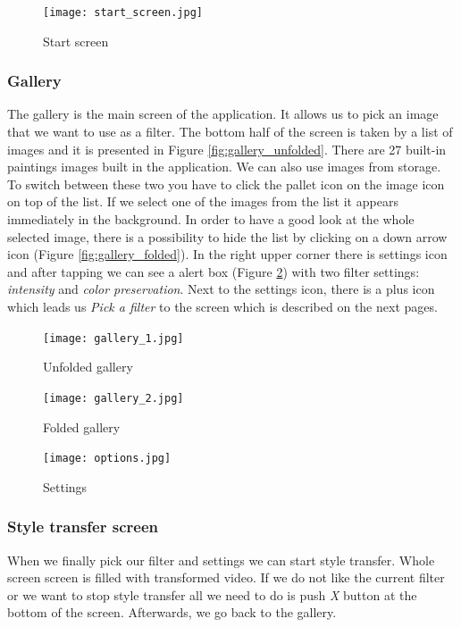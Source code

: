 \documentclass[../Main.tex]{subfiles}
\begin{document}
\begin{figure}[H]
    \centering
    \texttt{[image: start\_screen.jpg]}
    \caption{Start screen}
    \label{fig:start-screen}
\end{figure}


\subsubsection{Gallery}
The gallery is the main screen of the application. It allows us to pick an image 
that we want to use as a filter. The bottom half of the screen is taken by a list of images and it is presented in Figure \ref{fig:gallery_unfolded}.
There are 27 built-in paintings images built in the application. We can also use images from storage.
To switch between these two you have to click the pallet icon on the image icon on top of the list.
If we select one of the images from the list it appears immediately in the background.
In order to have a good look at the whole selected image, there is a possibility 
to hide the list by clicking on a down arrow icon (Figure \ref{fig:gallery_folded}).
In the right upper corner there is settings icon and after tapping we can see a 
alert box (Figure \ref{fig:gallery_options}) with two filter settings:
\textit{intensity} and \textit{color preservation}.
Next to the settings icon, there is a plus icon which leads us \textit{Pick a filter} 
to the screen which is described on the next pages.


\begin{figure}[H]
        \texttt{[image: gallery\_1.jpg]}
        \caption{Unfolded gallery}\label{fig:gallery_unfolded}
    \endminipage\hfill
        \texttt{[image: gallery\_2.jpg]}
        \caption{Folded gallery}\label{fig:gallery_folded}
    \endminipage\hfill
        \texttt{[image: options.jpg]}
        \caption{Settings}\label{fig:gallery_options}
    \endminipage\hfill
\end{figure}


\subsubsection{Style transfer screen}
When we finally pick our filter and settings we can start style transfer.
Whole screen screen is filled with transformed video.
If we do not like the current filter or we want to stop style transfer all we need to 
do is push \textit{X} button at the bottom of the screen.
Afterwards, we go back to the gallery. 
\end{document}
